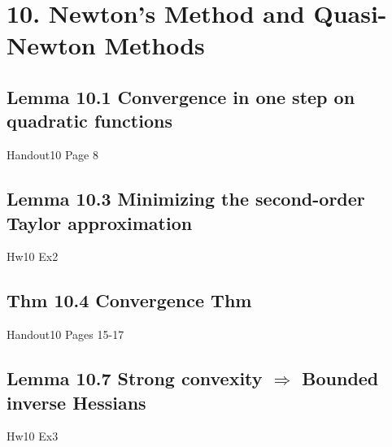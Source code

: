 \section*{10. Newton's Method and Quasi-Newton Methods}
\subsection*{Lemma 10.1 Convergence in one step on quadratic functions}
Handout10 Page 8


\subsection*{Lemma 10.3 Minimizing the second-order Taylor approximation}
Hw10 Ex2


\subsection*{Thm 10.4 Convergence Thm}
Handout10 Pages 15-17


\subsection*{Lemma 10.7 Strong convexity $\Rightarrow$ Bounded inverse Hessians}
Hw10 Ex3
